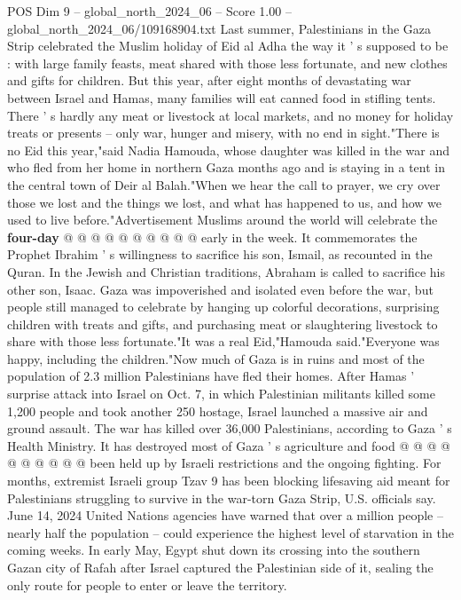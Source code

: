\begin{textsample}{POS Dim 9 – global\_north\_2024\_06 – Score 1.00 – global\_north\_2024\_06/109168904.txt}  \label{ex:f9_pos_287}
Last summer, Palestinians in the Gaza Strip celebrated the Muslim holiday of Eid al Adha the way it ' s supposed to be : with large family feasts, meat shared with those less fortunate, and new clothes and gifts for children.
But this year, after eight months of devastating war between Israel and Hamas, many families will eat canned food in stifling tents.
There ' s hardly any meat or livestock at local markets, and no money for holiday treats or presents -- only war, hunger and misery, with no end in sight."There is no Eid this year,"said Nadia Hamouda, whose daughter was killed in the war and who fled from her home in northern Gaza months ago and is staying in a tent in the central town of Deir al Balah."When we hear the call to prayer, we cry over those we lost and the things we lost, and what has happened to us, and how we used to live before."Advertisement Muslims around the world will celebrate the \textbf{four-day} @ @ @ @ @ @ @ @ @ @ early in the week.
It commemorates the Prophet Ibrahim ' s willingness to sacrifice his son, Ismail, as recounted in the Quran.
In the Jewish and Christian traditions, Abraham is called to sacrifice his other son, Isaac.
Gaza was impoverished and isolated even before the war, but people still managed to celebrate by hanging up colorful decorations, surprising children with treats and gifts, and purchasing meat or slaughtering livestock to share with those less fortunate."It was a real Eid,"Hamouda said."Everyone was happy, including the children."Now much of Gaza is in ruins and most of the population of 2.3 million Palestinians have fled their homes.
After Hamas ' surprise attack into Israel on Oct. 7, in which Palestinian militants killed some 1,200 people and took another 250 hostage, Israel launched a massive air and ground assault.
The war has killed over 36,000 Palestinians, according to Gaza ' s Health Ministry.
It has destroyed most of Gaza ' s agriculture and food @ @ @ @ @ @ @ @ @ @ been held up by Israeli restrictions and the ongoing fighting.
For months, extremist Israeli group Tzav 9 has been blocking lifesaving aid meant for Palestinians struggling to survive in the war-torn Gaza Strip, U.S. officials say.
June 14, 2024 United Nations agencies have warned that over a million people -- nearly half the population -- could experience the highest level of starvation in the coming weeks.
In early May, Egypt shut down its crossing into the southern Gazan city of Rafah after Israel captured the Palestinian side of it, sealing the only route for people to enter or leave the territory.

\end{textsample}
